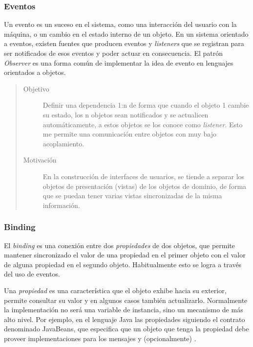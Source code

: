 \subsubsection{Eventos}
\label{Eventos}

		Un evento es un suceso en el sistema, como una interacción del usuario con
	la máquina, o un cambio en el estado interno de un objeto.
	En un sistema orientado a eventos, existen fuentes que producen eventos y
	\emph{listeners} que se registran para ser notificados de esos eventos y poder
	actuar en consecuencia.	
	El patrón \emph{Observer} \cite{Gamma1995} es una forma común de implementar la
	idea de evento en lenguajes orientados a objetos.
	
	\begin{quote}
	
	\begin{description}
	   
	\item [Objetivo] Definir una dependencia 1:n de forma que cuando el objeto
		1 cambie su estado, los n objetos sean notificados y se actualicen
		automáticamente, a estos objetos se los conoce como \emph{listener}. Esto me
		permite una comunicación entre objetos con muy bajo acoplamiento.
	
	\item [Motivación] En la construcción de interfaces de usuarios, se tiende
		a separar los objetos de presentación (vistas) de los objetos de dominio, de
		forma que se puedan tener varias vistas sincronizadas de la misma información.
	
	\end{description}
	\end{quote}
	
\subsubsection{Binding}
\label{binding}

	El \emph{binding} es una conexión entre dos \emph{propiedades} de dos objetos, que
	permite mantener sincronizado el valor de una propiedad en el primer
	objeto con el valor de alguna propiedad en el segundo objeto.
	Habitualmente esto se logra a través del uso de eventos.
	
	Una \emph{propiedad} es una característica que el objeto exhibe hacia su exterior, 
	permite consultar su valor y en algunos casos también actualizarlo.
	Normalmente la implementación no será una variable de instancia, sino un mecanismo de más alto nivel.
	Por ejemplo, en el lenguaje Java las propiedades siguiendo el contrato denominado JavaBeans, 
	que especifica que un objeto que tenga la propiedad  
	debe proveer implementaciones para los mensajes  y (opcionalmente) .
	
